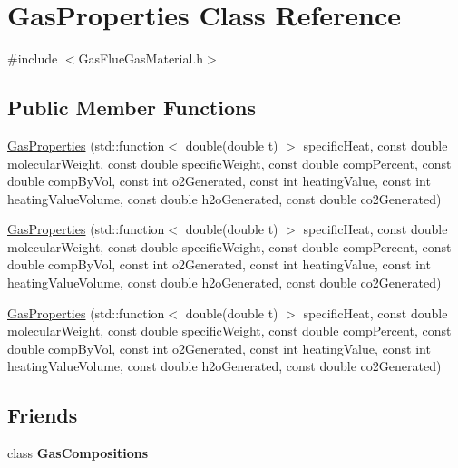 \hypertarget{class_gas_properties}{}\section{Gas\+Properties Class Reference}
\label{class_gas_properties}


{\ttfamily \#include $<$Gas\+Flue\+Gas\+Material.\+h$>$}

\subsection*{Public Member Functions}
\begin{DoxyCompactItemize}
\item 
\hyperlink{class_gas_properties_a8959cd25ac00e9e0e75cd957eca74e5e}{Gas\+Properties} (std\+::function$<$ double(double t) $>$ specific\+Heat, const double molecular\+Weight, const double specific\+Weight, const double comp\+Percent, const double comp\+By\+Vol, const int o2\+Generated, const int heating\+Value, const int heating\+Value\+Volume, const double h2o\+Generated, const double co2\+Generated)
\item 
\hyperlink{class_gas_properties_a8959cd25ac00e9e0e75cd957eca74e5e}{Gas\+Properties} (std\+::function$<$ double(double t) $>$ specific\+Heat, const double molecular\+Weight, const double specific\+Weight, const double comp\+Percent, const double comp\+By\+Vol, const int o2\+Generated, const int heating\+Value, const int heating\+Value\+Volume, const double h2o\+Generated, const double co2\+Generated)
\item 
\hyperlink{class_gas_properties_a8959cd25ac00e9e0e75cd957eca74e5e}{Gas\+Properties} (std\+::function$<$ double(double t) $>$ specific\+Heat, const double molecular\+Weight, const double specific\+Weight, const double comp\+Percent, const double comp\+By\+Vol, const int o2\+Generated, const int heating\+Value, const int heating\+Value\+Volume, const double h2o\+Generated, const double co2\+Generated)
\end{DoxyCompactItemize}
\subsection*{Friends}
\begin{DoxyCompactItemize}
\item 
\mbox{\label{class_gas_properties_a6e100081844218e60cdfbed234a59292}} 
class {\bfseries Gas\+Compositions}
\end{DoxyCompactItemize}


